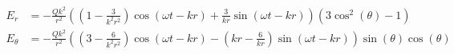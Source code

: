 \documentclass{article}
\begin{document}

\addtocounter{equation}{2}
\begin{align}
    E_r &= - \frac{Q k^{2}}{r^{2}} \left(\left(1 - \frac{3}{k^{2} r^{2}}\right) \cos{\left(\omega t - k r \right )} + \frac{3}{k r} \sin{\left (\omega t - k r \right )}\right) \left(3 \cos^{2}{\left (\theta \right )} - 1\right) \\
  E_\theta &= - \frac{Q k^{2}}{r^{2}} \left(\left(3 - \frac{6}{k^{2} r^{2}}\right) \cos{\left (\omega t - k r \right )} - \left(k r - \frac{6}{k r}\right) \sin{\left (\omega t - k r \right )}\right) \sin{\left (\theta \right )} \cos{\left (\theta \right )}
\end{align}
\end{document}
